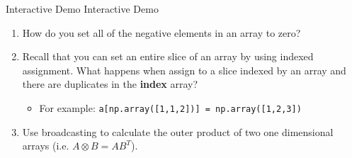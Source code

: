 \documentclass[serif,xcolor=pdftex,dvipsnames,table,hyperref={bookmarks=false,breaklinks}]{beamer}
\begin{document}
\begin{frame}[t]{Broadcasting}
	\centering
	\texttt{[image: \{../Figures/array\_slicing/Slide13]}.png}
\end{frame}

\begin{frame}[t,fragile]{Interactive Demo}
	\centering
	\Huge{Interactive Demo}
	\normalsize
	\begin{enumerate}
		\item How do you set all of the negative elements in an array to zero?
		\item Recall that you can set an entire slice of an array by using indexed assignment. What happens when assign to a slice indexed by an array and there are duplicates in the \textbf{index} array?
		\begin{itemize}
			\item For example: \verb|a[np.array([1,1,2])] = np.array([1,2,3])|
		\end{itemize}
		\item Use broadcasting to calculate the outer product of two one dimensional arrays (i.e. $A\otimes B = AB^T$).
	\end{enumerate}
\end{frame}

	
\end{document}
